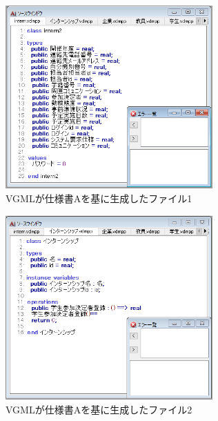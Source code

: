 \begin{figure}[p]
    \begin{center}
    \includegraphics[width=300]{image/indication_vdm1.PNG}
    \caption{VGMLが仕様書Aを基に生成したファイル1}
    \label{fig:indication_vdm1}
    \end{center}
\end{figure}

\begin{figure}[p]
    \begin{center}
    \includegraphics[width=300]{image/indication_vdm2.PNG}
    \caption{VGMLが仕様書Aを基に生成したファイル2}
    \label{fig:indication_vdm2}
    \end{center}
\end{figure}

